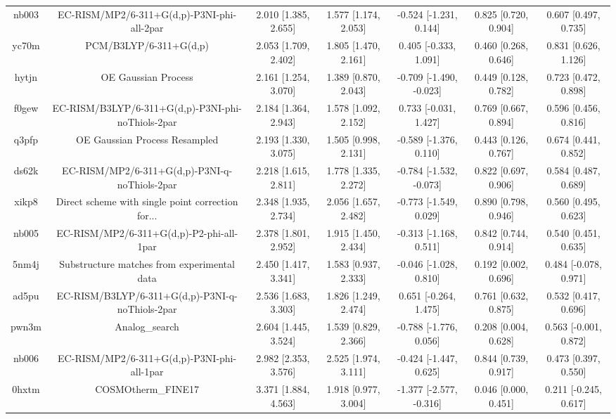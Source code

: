 \documentclass{article}
\begin{document}
\begin{center}
\begin{longtable}{|ccccccc|}
 nb003 &         EC-RISM/MP2/6-311+G(d,p)-P3NI-phi-all-2par &  2.010 [1.385, 2.655] &  1.577 [1.174, 2.053] &   -0.524 [-1.231, 0.144] &  0.825 [0.720, 0.904] &   0.607 [0.497, 0.735] \\
 yc70m &                             PCM/B3LYP/6-311+G(d,p) &  2.053 [1.709, 2.402] &  1.805 [1.470, 2.161] &    0.405 [-0.333, 1.091] &  0.460 [0.268, 0.646] &   0.831 [0.626, 1.126] \\
 hytjn &                                OE Gaussian Process &  2.161 [1.254, 3.070] &  1.389 [0.870, 2.043] &  -0.709 [-1.490, -0.023] &  0.449 [0.128, 0.782] &   0.723 [0.472, 0.898] \\
 f0gew &  EC-RISM/B3LYP/6-311+G(d,p)-P3NI-phi-noThiols-2par &  2.184 [1.364, 2.943] &  1.578 [1.092, 2.152] &    0.733 [-0.031, 1.427] &  0.769 [0.667, 0.894] &   0.596 [0.456, 0.816] \\
 q3pfp &                      OE Gaussian Process Resampled &  2.193 [1.330, 3.075] &  1.505 [0.998, 2.131] &   -0.589 [-1.376, 0.110] &  0.443 [0.126, 0.767] &   0.674 [0.441, 0.852] \\
 ds62k &      EC-RISM/MP2/6-311+G(d,p)-P3NI-q-noThiols-2par &  2.218 [1.615, 2.811] &  1.778 [1.335, 2.272] &  -0.784 [-1.532, -0.073] &  0.822 [0.697, 0.906] &   0.584 [0.487, 0.689] \\
 xikp8 &  Direct scheme with single point correction for... &  2.348 [1.935, 2.734] &  2.056 [1.657, 2.482] &   -0.773 [-1.549, 0.029] &  0.890 [0.798, 0.946] &   0.560 [0.495, 0.623] \\
 nb005 &           EC-RISM/MP2/6-311+G(d,p)-P2-phi-all-1par &  2.378 [1.801, 2.952] &  1.915 [1.450, 2.434] &   -0.313 [-1.168, 0.511] &  0.842 [0.744, 0.914] &   0.540 [0.451, 0.635] \\
 5nm4j &        Substructure matches from experimental data &  2.450 [1.417, 3.341] &  1.583 [0.937, 2.333] &   -0.046 [-1.028, 0.810] &  0.192 [0.002, 0.696] &  0.484 [-0.078, 0.971] \\
 ad5pu &    EC-RISM/B3LYP/6-311+G(d,p)-P3NI-q-noThiols-2par &  2.536 [1.683, 3.303] &  1.826 [1.249, 2.474] &    0.651 [-0.264, 1.475] &  0.761 [0.632, 0.875] &   0.532 [0.417, 0.696] \\
 pwn3m &                                     Analog\_search &  2.604 [1.445, 3.524] &  1.539 [0.829, 2.366] &   -0.788 [-1.776, 0.056] &  0.208 [0.004, 0.628] &  0.563 [-0.001, 0.872] \\
 nb006 &         EC-RISM/MP2/6-311+G(d,p)-P3NI-phi-all-1par &  2.982 [2.353, 3.576] &  2.525 [1.974, 3.111] &   -0.424 [-1.447, 0.625] &  0.844 [0.739, 0.917] &   0.473 [0.397, 0.550] \\
 0hxtm &                                 COSMOtherm\_FINE17 &  3.371 [1.884, 4.563] &  1.918 [0.977, 3.004] &  -1.377 [-2.577, -0.316] &  0.046 [0.000, 0.451] &  0.211 [-0.245, 0.617] \\
\end{longtable}
\end{center}
\end{document}
